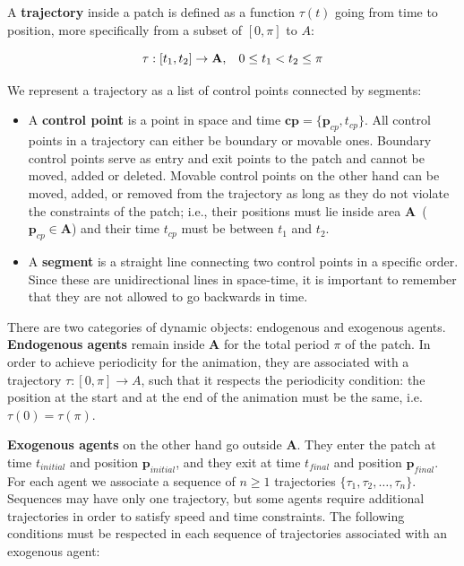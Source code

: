 A {\bf trajectory} inside a patch is defined as a function $\tau(t)$ going from time to position, more specifically from a subset of $[0, \pi]$ to $A$:

\begin{equation}
	\tau:[t_1,t_2]\rightarrow \mathbf{A}, \hspace{0.3cm} 0 \leq t_1 < t_2 \leq \pi
	\label{eqn:trajectory}
\end{equation}

We represent a trajectory as a list of control points connected by segments:

\begin{itemize}
  \item A {\bf control point} is a point in space and time $\mathbf{cp} = \{\mathbf{p}_{cp}, t_{cp}\}$.
All control points in a trajectory can either be boundary or movable ones.
Boundary control points serve as entry and exit points to the patch and cannot be moved, added or deleted.
Movable control points on the other hand can be moved, added, or removed from the trajectory as long as they do not violate the constraints of the patch; i.e., their positions must lie inside area $\mathbf{A}$~($\mathbf{p}_{cp} \in \mathbf{A}$) and their time $t_{cp}$ must be between $t_1$ and $t_2$.
 \item A {\bf segment} is a straight line connecting two control points in a specific order. Since these are unidirectional lines in space-time, it is important to remember that they are not allowed to go backwards in time.  
\end{itemize}


There are two categories of dynamic objects: endogenous and exogenous agents.
{\bf Endogenous agents} remain inside $\mathbf{A}$ for the total period $\pi$ of the patch.
In order to achieve periodicity for the animation, they are associated with a trajectory $\tau : [0,\pi] \rightarrow \mathbf{}A$, such that it respects the periodicity condition: the position at the start and at the end of the animation must be the same, i.e. \mbox{$\tau (0) = \tau (\pi)$}.

{\bf Exogenous agents} on the other hand go outside $\mathbf{A}$.
They enter the patch at time $t_{initial}$ and position $\mathbf{p}_{initial}$, and they exit at time $t_{final}$ and position $\mathbf{p}_{final}$.
For each agent we associate a sequence of $n \ge 1$ trajectories $\{ \tau_1, \tau_2, \dots, \tau_n\}$.
Sequences may have only one trajectory, but some agents require additional trajectories in order to satisfy speed and time constraints.
The following conditions must be respected in each sequence of trajectories associated with an exogenous agent:

